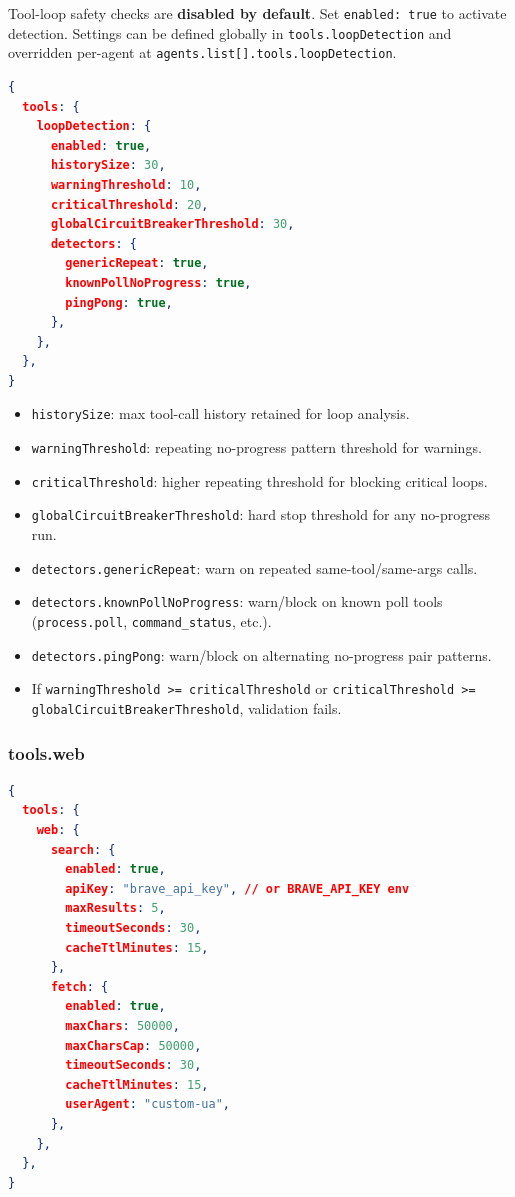 Tool-loop safety checks are \textbf{disabled by default}. Set \texttt{enabled: true} to activate detection.
Settings can be defined globally in \texttt{tools.loopDetection} and overridden per-agent at \texttt{agents.list[].tools.loopDetection}.

\begin{lstlisting}[language=json]
{
  tools: {
    loopDetection: {
      enabled: true,
      historySize: 30,
      warningThreshold: 10,
      criticalThreshold: 20,
      globalCircuitBreakerThreshold: 30,
      detectors: {
        genericRepeat: true,
        knownPollNoProgress: true,
        pingPong: true,
      },
    },
  },
}
\end{lstlisting}


\begin{itemize}
  \item \texttt{historySize}: max tool-call history retained for loop analysis.
  \item \texttt{warningThreshold}: repeating no-progress pattern threshold for warnings.
  \item \texttt{criticalThreshold}: higher repeating threshold for blocking critical loops.
  \item \texttt{globalCircuitBreakerThreshold}: hard stop threshold for any no-progress run.
  \item \texttt{detectors.genericRepeat}: warn on repeated same-tool/same-args calls.
  \item \texttt{detectors.knownPollNoProgress}: warn/block on known poll tools (\texttt{process.poll}, \texttt{command\_status}, etc.).
  \item \texttt{detectors.pingPong}: warn/block on alternating no-progress pair patterns.
  \item If \texttt{warningThreshold >= criticalThreshold} or \texttt{criticalThreshold >= globalCircuitBreakerThreshold}, validation fails.
\end{itemize}


\subsubsection{tools.web}


\begin{lstlisting}[language=json]
{
  tools: {
    web: {
      search: {
        enabled: true,
        apiKey: "brave_api_key", // or BRAVE_API_KEY env
        maxResults: 5,
        timeoutSeconds: 30,
        cacheTtlMinutes: 15,
      },
      fetch: {
        enabled: true,
        maxChars: 50000,
        maxCharsCap: 50000,
        timeoutSeconds: 30,
        cacheTtlMinutes: 15,
        userAgent: "custom-ua",
      },
    },
  },
}
\end{lstlisting}


